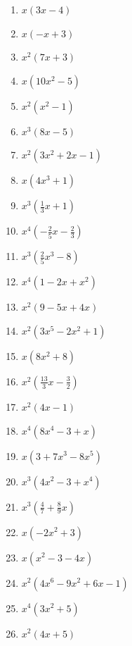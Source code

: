 \begin{Answer}[ref=ausklammernA1]

	\begin{minipage}{\textwidth}
		\begin{minipage}{0.46\textwidth}
			\begin{enumerate}[label=\alph*)]
				\item \(x\left( 3x-4\right)\)
				\item \(x\left(-x+3\right)\)
				\item \(x^2\left(7x+3\right)\)
				\item \(x\left(10x^2-5\right)\)
				\item \(x^2\left(x^2-1\right)\)
				\item \(x^3\left(8x-5\right)\)
				\item \(x^2\left(3x^2+2x-1\right)\)
				\item \(x\left(4x^3+1\right)\)
				\item \(x^3\left(\frac{1}{3}x+1\right)\)
				\item \(x^4\left(-\frac{2}{5}x-\frac{2}{3}\right)\)
				\item \(x^3\left(\frac{2}{5}x^3-8\right)\)
				\item \(x^4\left(1-2x+x^2\right)\)
				\item \(x^2\left(9-5x+4x\right)\)
			\end{enumerate}
		\end{minipage}%
		\begin{minipage}{0.54\textwidth}
			\begin{enumerate}[label=\alph*)]
				\setcounter{enumi}{13}
				\item \(x^2\left(3x^5-2x^2+1\right)\)
				\item \(x\left(8x^2+8\right)\)
				\item \(x^2\left(\frac{13}{3}x-\frac{3}{2}\right)\)
				\item \(x^2\left(4x-1\right)\)
				\item \(x^4\left(8x^4-3+x\right)\)
				\item \(x\left(3+7x^3-8x^5\right)\)
				\item \(x^3\left(4x^2-3+x^4\right)\)
				\item \(x^3\left(\frac{4}{7}+\frac{8}{9}x\right)\)
				\item \(x\left(-2x^2+3\right)\)
				\item \(x\left(x^2-3-4x\right)\)
				\item \(x^2\left(4x^6-9x^2+6x-1\right)\)
				\item \(x^4\left(3x^2+5\right)\)
				\item \(x^2\left(4x+5\right)\)
			\end{enumerate}
		\end{minipage}%
	\end{minipage}%
\end{Answer}
